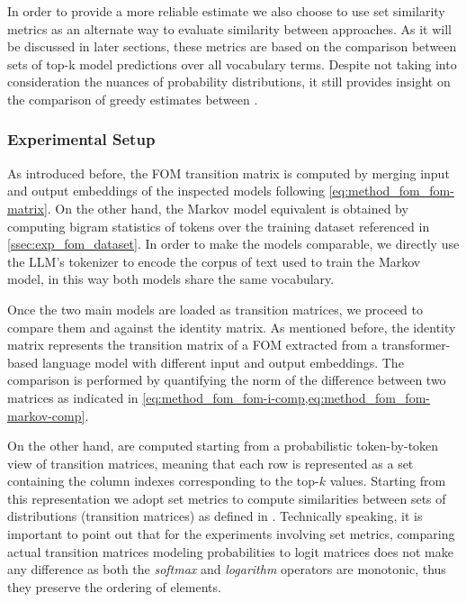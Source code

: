 In order to provide a more reliable estimate we also choose to use set similarity metrics as an alternate way to evaluate similarity between approaches.
As it will be discussed  in later sections, these metrics are based on the comparison between sets of top-k model predictions over all vocabulary terms.
Despite  not taking into consideration the nuances of probability distributions, it still provides insight on the comparison of greedy estimates between .

\subsubsection{Experimental Setup}

As introduced before, the FOM transition matrix is computed by merging input and output embeddings of the inspected models following \cref{eq:method_fom_fom-matrix}.
On the other hand, the Markov model equivalent is obtained by computing bigram statistics of tokens over the training dataset referenced in \cref{ssec:exp_fom_dataset}.
In order to make the models comparable, we directly use the LLM's tokenizer to encode the corpus of text used to train the Markov model, in this way both models share the same vocabulary.

Once the two main models are loaded as transition matrices, we proceed to compare them  and against the identity matrix.
As mentioned before, the identity matrix represents the transition matrix of a FOM extracted from a transformer-based language model with different input and output embeddings.
The comparison is performed by quantifying the norm of the difference between two matrices as indicated in \cref{eq:method_fom_fom-i-comp,eq:method_fom_fom-markov-comp}.

On the other hand,  are computed starting from a probabilistic token-by-token view of transition matrices, meaning that each row is represented as a set containing the column indexes corresponding to the top-$k$ values.
Starting from this representation we adopt set metrics to compute similarities between sets of distributions (transition matrices) as defined in . 
Technically speaking, it is important to point out that for the experiments involving set metrics, comparing actual transition matrices modeling probabilities to logit matrices does not make any difference as both the \textit{softmax} and \textit{logarithm} operators are monotonic, thus they preserve the ordering of elements.

